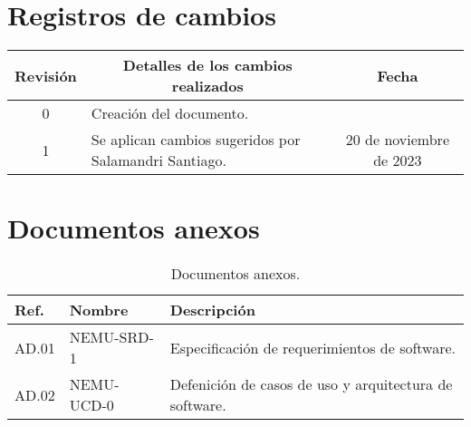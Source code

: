 \documentclass[
  11pt, %
  codirector, %
]{charter}
\begin{document}
\maketitle
\tableofcontents

\newpage

\section*{Registros de cambios}
\label{sec:registro}


\begin{table}[ht]
	\label{tab:registro}
	\centering
	\begin{tabularx}{\linewidth}{@{}|c|X|c|@{}}
		\hline
		\rowcolor[HTML]{C0C0C0}
		Revisión & \multicolumn{1}{c|}{\cellcolor[HTML]{C0C0C0}Detalles de los cambios realizados} & Fecha      \\ \hline
		0      & Creación del documento.                                 &\fechaInicioName \\ \hline

    		1      & Se aplican cambios sugeridos por Salamandri Santiago. & 20 de noviembre de 2023 \\ \hline


    \hline

	\end{tabularx}
	\label{sec:cierre}
\end{table}



\section*{Documentos anexos}
\label{sec:documentos_anexos}

\begin{table}[h!]
	\centering
	\begin{tabular}{ | m{1.5cm} | m{3cm} | m{10.5cm} | }
		\hline
		\rowcolor{gray!50} %
		\textbf{Ref.} & \textbf{Nombre} & \textbf{Descripción} \\ \hline
    AD.01 & NEMU-SRD-1 & Especificación de requerimientos de software. \\ \hline
		AD.02 & NEMU-UCD-0 & Defenición de casos de uso y arquitectura de software.
    \\ \hline
	\end{tabular}
  \caption{Documentos anexos.}
  \label{tab:referencias}

\end{table}
\end{document}
